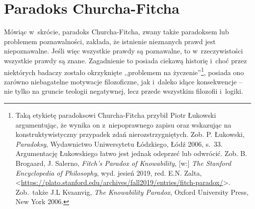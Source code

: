 \section{Paradoks Churcha-Fitcha}


Mówiąc w~skrócie, paradoks Churcha-Fitcha, zwany także paradoksem lub problemem poznawalności, zakłada, że istnienie nieznanych prawd jest niepoznawalne. Jeśli więc wszystkie prawdy są poznawalne, to w~rzeczywistości wszystkie prawdy są znane. Zagadnienie to posiada ciekawą historię i~choć przez niektórych badaczy zostało okrzyknięte ,,problemem na życzenie''\footnote{Taką etykietę paradoksowi Churcha-Fitcha przybił Piotr Łukowski argumentując, że wynika on z~niepoprawnego zapisu oraz wskazując na konstruktywistyczny przypadek zdań nierozstrzygniętych. Zob. P. Łukowski, \textit{Paradoksy}, Wydawnictwo Uniwersytetu Łódzkiego, Łódź 2006, s.~33. Argumentację Łukowskiego łatwo jest jednak odeprzeć lub odwrócić. Zob. B. Brogaard, J. Salerno, \textit{Fitch's Paradox of Knowability}, [w:] \textit{The Stanford Encyclopedia of Philosophy}, wyd. jesień 2019, red. E.N. Zalta, <\url{https://plato.stanford.edu/archives/fall2019/entries/fitch-paradox/}>. Zob.~także J.L Kvaanvig, \textit{The Knowability Paradox}, Oxford University Press, New York 2006.}, posiada ono zarówno niebagatelne motywacje filozoficzne, jak i~daleko idące konsekwencje -- nie tylko na gruncie teologii negatywnej, lecz przede wszystkim filozofii i~logiki.


